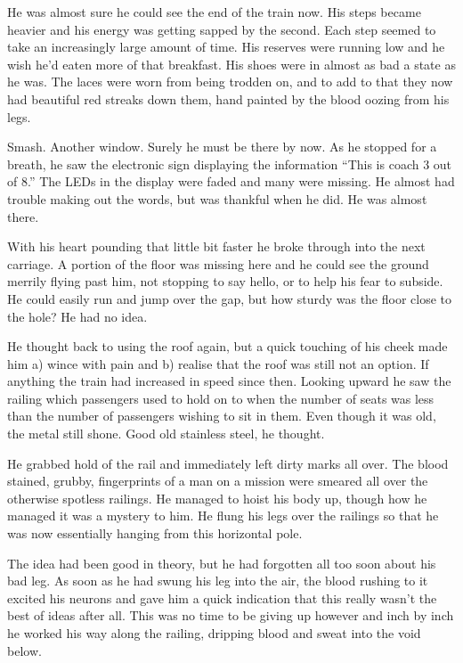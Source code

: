 He was almost sure he could see the end of the train now.  His steps became heavier and his energy was getting sapped by the second.  Each step seemed to take an increasingly large amount of time.  His reserves were running low and he wish he'd eaten more of that breakfast.  His shoes were in almost as bad a state as he was.  The laces were worn from being trodden on, and to add to that they now had beautiful red streaks down them, hand painted by the blood oozing from his legs.

Smash.  Another window.  Surely he must be there by now.  As he stopped for a breath, he saw the electronic sign displaying the information ``This is coach 3 out of 8.''  The LEDs in the display were faded and many were missing.  He almost had trouble making out the words, but was thankful when he did.  He was almost there.

With his heart pounding that little bit faster he broke through into the next carriage.  A portion of the floor was missing here and he could see the ground merrily flying past him, not stopping to say hello, or to help his fear to subside.  He could easily run and jump over the gap, but how sturdy was the floor close to the hole?  He had no idea.

He thought back to using the roof again, but a quick touching of his cheek made him a) wince with pain and b) realise that the roof was still not an option.  If anything the train had increased in speed since then.  Looking upward he saw the railing which passengers used to hold on to when the number of seats was less than the number of passengers wishing to sit in them.  Even though it was old, the metal still shone.  Good old stainless steel, he thought.  

He grabbed hold of the rail and immediately left dirty marks all over.  The blood stained, grubby, fingerprints of a man on a mission were smeared all over the otherwise spotless railings.  He managed to hoist his body up, though how he managed it was a mystery to him.  He flung his legs over the railings so that he was now essentially hanging from this horizontal pole.

The idea had been good in theory, but he had forgotten all too soon about his bad leg.  As soon as he had swung his leg into the air, the blood rushing to it excited his neurons and gave him a quick indication that this really wasn't the best of ideas after all.  This was no time to be giving up however and inch by inch he worked his way along the railing, dripping blood and sweat into the void below.  

